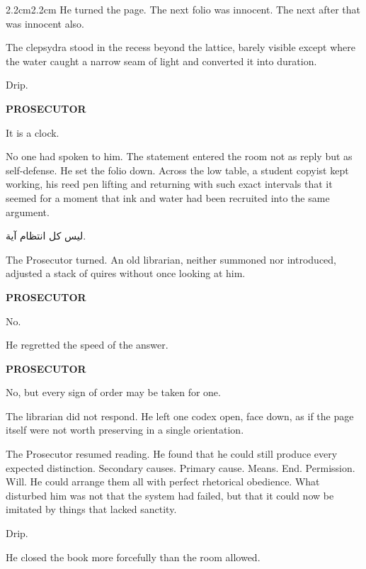 \begin{adjustwidth}{2.2cm}{2.2cm}
He turned the page. The next folio was innocent. The next after that was innocent also.

The clepsydra stood in the recess beyond the lattice, barely visible except where the
water caught a narrow seam of light and converted it into duration.

\medskip

Drip.

\medskip

\textbf{PROSECUTOR}

It is a clock.

\medskip

No one had spoken to him. The statement entered the room not as reply but as
self-defense. He set the folio down. Across the low table, a student copyist kept
working, his reed pen lifting and returning with such exact intervals that it seemed
for a moment that ink and water had been recruited into the same argument.

\medskip

\begin{AR}
ليس كل انتظام آية.
\end{AR}

\medskip

The Prosecutor turned. An old librarian, neither summoned nor introduced, adjusted
a stack of quires without once looking at him.

\medskip

\textbf{PROSECUTOR}

No.

\medskip

He regretted the speed of the answer.

\medskip

\textbf{PROSECUTOR}

No, but every sign of order may be taken for one.

\medskip

The librarian did not respond. He left one codex open, face down, as if the page
itself were not worth preserving in a single orientation.

The Prosecutor resumed reading. He found that he could still produce every expected
distinction. Secondary causes. Primary cause. Means. End. Permission. Will. He could
arrange them all with perfect rhetorical obedience. What disturbed him was not that
the system had failed, but that it could now be imitated by things that lacked sanctity.

\medskip

Drip.

\medskip

He closed the book more forcefully than the room allowed.

\end{adjustwidth}

